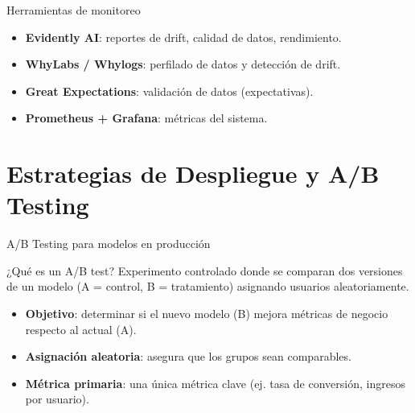 \documentclass[aspectratio=169, 10pt, xcolor=table]{beamer}
\begin{document}
\begin{frame}{Herramientas de monitoreo}
    \begin{itemize}
        \item \textbf{Evidently AI}: reportes de drift, calidad de datos, rendimiento.
        \item \textbf{WhyLabs / Whylogs}: perfilado de datos y detección de drift.
        \item \textbf{Great Expectations}: validación de datos (expectativas).
        \item \textbf{Prometheus + Grafana}: métricas del sistema.
    \end{itemize}
\end{frame}






\section{Estrategias de Despliegue y A/B Testing}

\begin{frame}{A/B Testing para modelos en producción}
    \begin{block}{¿Qué es un A/B test?}
        Experimento controlado donde se comparan dos versiones de un modelo (A = control, B = tratamiento) asignando usuarios aleatoriamente.
    \end{block}
    \begin{itemize}
        \item \textbf{Objetivo}: determinar si el nuevo modelo (B) mejora métricas de negocio respecto al actual (A).
        \item \textbf{Asignación aleatoria}: asegura que los grupos sean comparables.
        \item \textbf{Métrica primaria}: una única métrica clave (ej. tasa de conversión, ingresos por usuario).
    \end{itemize}
\end{frame}
\end{document}
